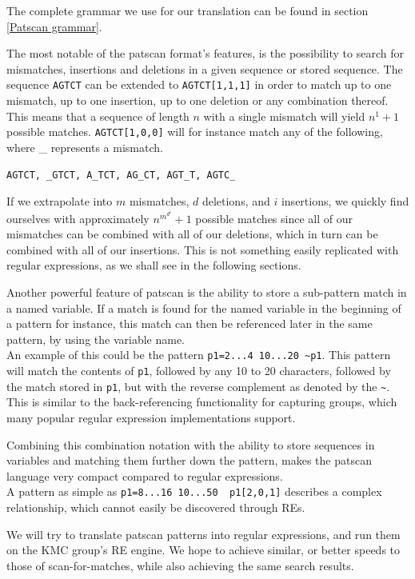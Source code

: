 \documentclass[12pt]{article}
\theoremstyle{definition}
\begin{document}
The complete grammar we use for our translation can be found in section \ref{Patscan grammar}.

The most notable of the patscan format's features, is the possibility to search for mismatches, insertions and deletions in a given sequence or stored sequence. The sequence \texttt{AGTCT} can be extended to \texttt{AGTCT[1,1,1]} in order to match up to one mismatch, up to one insertion, up to one deletion or any combination thereof. \\
This means that a sequence of length $n$ with a single mismatch will yield $n^1+1$ possible matches. \texttt{AGTCT[1,0,0]} will for instance match any of the following, where \_ represents a mismatch.

\texttt{AGTCT, \_GTCT, A\_TCT, AG\_CT, AGT\_T, AGTC\_}

If we extrapolate into $m$ mismatches, $d$ deletions, and $i$ insertions, we quickly find ourselves with approximately $n^{m^{d^{i}}}+1$ possible matches since all of our mismatches can be combined with all of our deletions, which in turn can be combined with all of our insertions. This is not something easily replicated with regular expressions, as we shall see in the following sections.

Another powerful feature of patscan is the ability to store a sub-pattern match in a named variable. If a match is found for the named variable in the beginning of a pattern for instance, this match can then be referenced later in the same pattern, by using the variable name. \\
An example of this could be the pattern \texttt{p1=2...4 10...20 \~{}p1}. This pattern will match the contents of \texttt{p1}, followed by any 10 to 20 characters, followed by the match stored in \texttt{p1}, but with the reverse complement as denoted by the \texttt{\~{}}.\\
This is similar to the back-referencing functionality for capturing groups, which many popular regular expression implementations support.%

Combining this combination notation with the ability to store sequences in variables and matching them further down the pattern, makes the patscan language very compact compared to regular expressions. \\
A pattern as simple as \texttt{p1=8...16 10...50 ~p1[2,0,1]} describes a complex relationship, which cannot easily be discovered through REs.

We will try to translate patscan patterns into regular expressions, and run them on the KMC group's RE engine. We hope to achieve similar, or better speeds to those of scan-for-matches, while also achieving the same search results.
\end{document}

